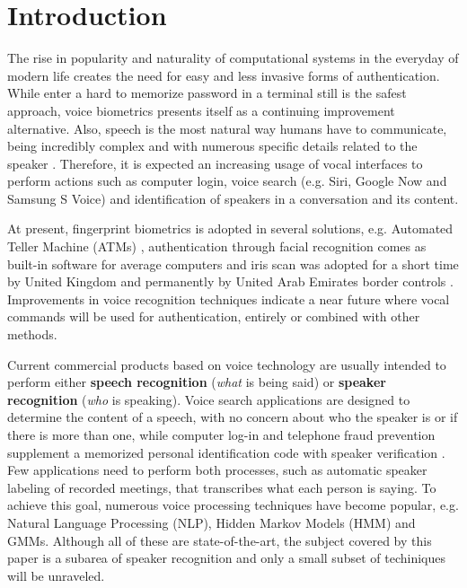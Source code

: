 \chapter{Introduction}

The rise in popularity and naturality of computational systems in the everyday of modern life creates the need for easy and less invasive forms of authentication. While enter a hard to memorize password in a terminal still is the safest approach, voice biometrics presents itself as a continuing improvement alternative. Also, speech is the most natural way humans have to communicate, being incredibly complex and with numerous specific details related to the speaker \autocite{bimbot.et.al.2004}. Therefore, it is expected an increasing usage of vocal interfaces to perform actions such as computer login, voice search (e.g. Siri, Google Now and Samsung S Voice) and identification of speakers in a conversation and its content.

At present, fingerprint biometrics is adopted in several solutions, e.g. Automated Teller Machine (ATMs) \autocite{wang.wu.2002}, authentication through facial recognition comes as built-in software for average computers and iris scan was adopted for a short time by United Kingdom and permanently by United Arab Emirates border controls \autocite{sasse.2007, raisi.khouri.2008}. Improvements in voice recognition techniques indicate a near future where vocal commands will be used for authentication, entirely or combined with other methods.

Current commercial products based on voice technology are usually intended to perform either \textbf{speech recognition} (\emph{what} is being said) or \textbf{speaker recognition} (\emph{who} is speaking). Voice search applications are designed to determine the content of a speech, with no concern about who the speaker is or if there is more than one, while computer log-in and telephone fraud prevention supplement a memorized personal identification code with speaker verification \autocite{reynolds.1995}. Few applications need to perform both processes, such as automatic speaker labeling of recorded meetings, that transcribes what each person is saying. To achieve this goal, numerous voice processing techniques have become popular, e.g. Natural Language Processing (NLP), Hidden Markov Models (HMM) and GMMs. Although all of these are state-of-the-art, the subject covered by this paper is a subarea of speaker recognition and only a small subset of techiniques will be unraveled.

